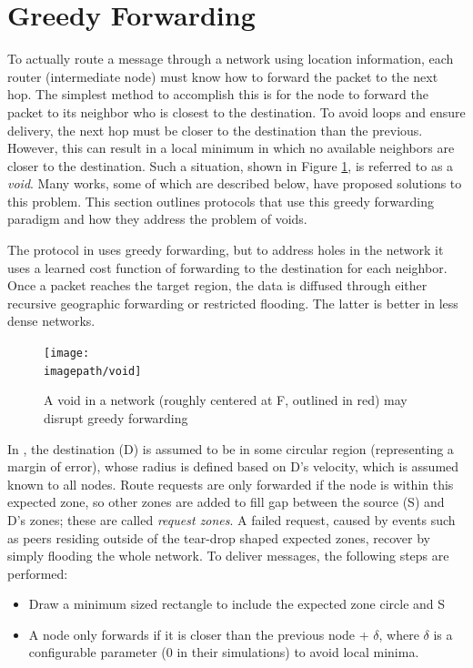 \documentclass[conference]{IEEEtran}
\newcommand{\imagepath}{../../images/external/location_routing}
\begin{document}

\section{Greedy Forwarding}

To actually route a message through a network using location information, each router (intermediate node) must know how to forward the packet to the next hop.
The simplest method to accomplish this is for the node to forward the packet to its neighbor who is closest to the destination.
To avoid loops and ensure delivery, the next hop must be closer to the destination than the previous.
However, this can result in a local minimum in which no available neighbors are closer to the destination.
Such a situation, shown in Figure \ref{fig:network-void}, is referred to as a \emph{void}.
Many works, some of which are described below, have proposed solutions to this problem.
This section outlines protocols that use this greedy forwarding paradigm and how they address the problem of voids.

The protocol in \cite{Yu01geographicaland} uses greedy forwarding, but to address holes in the network it uses a learned cost function of forwarding to the destination for each neighbor.  Once a packet reaches the target region, the data is diffused through either recursive geographic forwarding or restricted flooding.  The latter is better in less dense networks.

\begin{figure}
\label{fig:network-void}
\centering
\texttt{[image: \\imagepath/void]}
\caption{A void in a network (roughly centered at F, outlined in red) may disrupt greedy forwarding}
\end{figure}


In \cite{Ko98location-aidedrouting}, the destination (D) is assumed to be in some circular region (representing a margin of error), whose radius is defined based on D's velocity, which is assumed known to all nodes.
Route requests are only forwarded if the node is within this expected zone, so other zones are added to fill gap between the source (S) and D's zones; these are called \emph{request zones}.
A failed request, caused by events such as peers residing outside of the tear-drop shaped expected zones, recover by simply flooding the whole network.
To deliver messages, the following steps are performed:
\begin{itemize}
 	\item Draw a minimum sized rectangle to include the expected zone circle and S
	\item A node only forwards if it is closer than the previous node + $\delta$, where $\delta$ is a configurable parameter (0 in their simulations) to avoid local minima.
\end{itemize}
\end{document}
